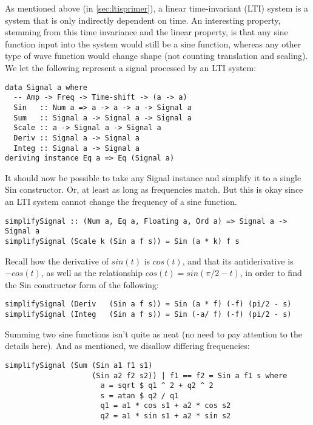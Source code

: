 As mentioned above (in \ref{sec:ltisprimer}), a linear time-invariant (LTI) system is a system that is only indirectly dependent on time. \iffalse More precisely, input signals may be linearly combined (superposed) or differentiated/integrated with respect to time. 
(As discussed (in \ref{sec:tf}), we can describe how an LTI system transforms an input signal to the output signal with a transfer function).\fi
An interesting property, stemming from this time invariance and the linear property, is that any sine function input into the system would still be a sine function, whereas any other type of wave function would change shape (not counting translation and scaling).
We let the following represent a signal processed by an LTI system:
\begin{verbatim}
data Signal a where
  -- Amp -> Freq -> Time-shift -> (a -> a)
  Sin   :: Num a => a -> a -> a -> Signal a
  Sum   :: Signal a -> Signal a -> Signal a
  Scale :: a -> Signal a -> Signal a
  Deriv :: Signal a -> Signal a
  Integ :: Signal a -> Signal a
deriving instance Eq a => Eq (Signal a)
\end{verbatim}
It should now be possible to take any Signal instance and simplify it to a single Sin constructor. Or, at least as long as frequencies match. But this is okay since an LTI system cannot change the frequency of a sine function.
\begin{verbatim}
simplifySignal :: (Num a, Eq a, Floating a, Ord a) => Signal a -> Signal a
simplifySignal (Scale k (Sin a f s)) = Sin (a * k) f s
\end{verbatim}
Recall how the derivative of $sin(t)$ is $cos(t)$, and that its antiderivative is $-cos(t)$, as well as the relationship $cos(t)=sin(\pi/2-t)$, in order to find the Sin constructor form of the following:
\begin{verbatim}
simplifySignal (Deriv   (Sin a f s)) = Sin (a * f) (-f) (pi/2 - s)
simplifySignal (Integ   (Sin a f s)) = Sin (-a/ f) (-f) (pi/2 - s)
\end{verbatim}
Summing two sine functions isn't quite as neat (no need to pay attention to the details here). And as mentioned, we disallow differing frequencies:
\begin{verbatim}
simplifySignal (Sum (Sin a1 f1 s1)
                    (Sin a2 f2 s2)) | f1 == f2 = Sin a f1 s where
                      a = sqrt $ q1 ^ 2 + q2 ^ 2
                      s = atan $ q2 / q1
                      q1 = a1 * cos s1 + a2 * cos s2
                      q2 = a1 * sin s1 + a2 * sin s2
\end{verbatim}
